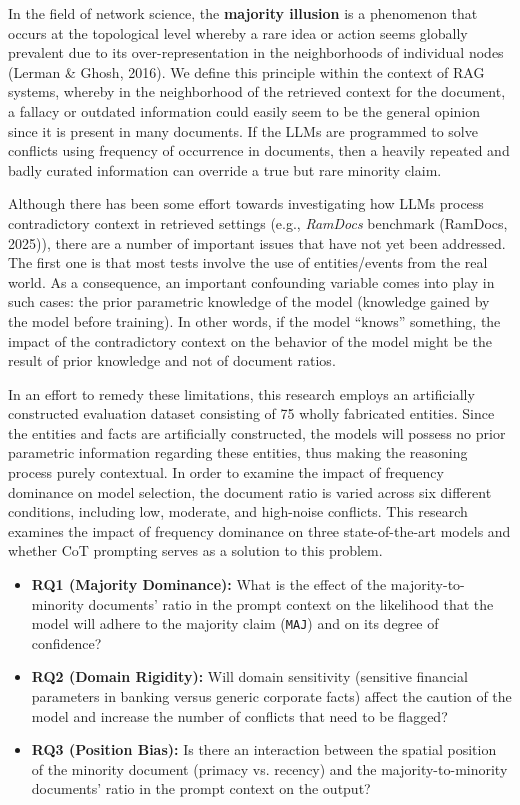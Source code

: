 \documentclass{article}
\begin{document}
In the field of network science, the \textbf{majority illusion} is a phenomenon that occurs at the topological level whereby a rare idea or action seems globally prevalent due to its over-representation in the neighborhoods of individual nodes (Lerman \& Ghosh, 2016). We define this principle within the context of RAG systems, whereby in the neighborhood of the retrieved context for the document, a fallacy or outdated information could easily seem to be the general opinion since it is present in many documents. If the LLMs are programmed to solve conflicts using frequency of occurrence in documents, then a heavily repeated and badly curated information can override a true but rare minority claim.

Although there has been some effort towards investigating how LLMs process contradictory context in retrieved settings (e.g., \textit{RamDocs} benchmark (RamDocs, 2025)), there are a number of important issues that have not yet been addressed. The first one is that most tests involve the use of entities/events from the real world. As a consequence, an important confounding variable comes into play in such cases: the prior parametric knowledge of the model (knowledge gained by the model before training). In other words, if the model ``knows'' something, the impact of the contradictory context on the behavior of the model might be the result of prior knowledge and not of document ratios.

In an effort to remedy these limitations, this research employs an artificially constructed evaluation dataset consisting of 75 wholly fabricated entities. Since the entities and facts are artificially constructed, the models will possess no prior parametric information regarding these entities, thus making the reasoning process purely contextual. In order to examine the impact of frequency dominance on model selection, the document ratio is varied across six different conditions, including low, moderate, and high-noise conflicts. This research examines the impact of frequency dominance on three state-of-the-art models and whether CoT prompting serves as a solution to this problem.

\begin{itemize}
    \item \textbf{RQ1 (Majority Dominance):} What is the effect of the majority-to-minority documents' ratio in the prompt context on the likelihood that the model will adhere to the majority claim (\texttt{MAJ}) and on its degree of confidence?
    \item \textbf{RQ2 (Domain Rigidity):} Will domain sensitivity (sensitive financial parameters in banking versus generic corporate facts) affect the caution of the model and increase the number of conflicts that need to be flagged?
    \item \textbf{RQ3 (Position Bias):} Is there an interaction between the spatial position of the minority document (primacy vs. recency) and the majority-to-minority documents' ratio in the prompt context on the output?
\end{itemize}
\end{document}
